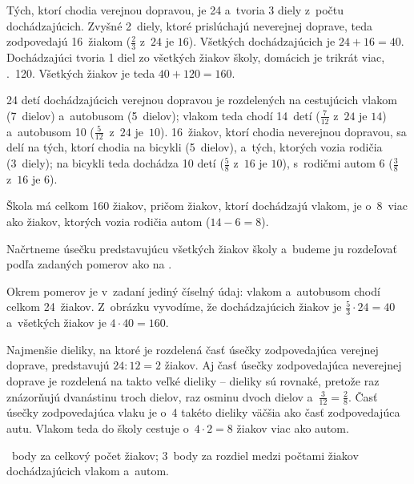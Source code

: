 {%
Tých, ktorí chodia verejnou dopravou, je 24 a~tvoria 3 diely z~počtu dochádzajúcich.
Zvyšné 2~diely, ktoré prislúchajú neverejnej doprave, teda zodpovedajú 16~žiakom
($\frac23$ z~$24$ je $16$).
Všetkých dochádzajúcich je $24 + 16 = 40$.
Dochádzajúci tvoria 1 diel zo všetkých žiakov školy, domácich je trikrát viac,
\tj.~120.
Všetkých žiakov je teda $40 + 120 = 160$.

24 detí dochádzajúcich verejnou dopravou je rozdelených na cestujúcich vlakom
(7~dielov) a~autobusom (5~dielov);
vlakom teda chodí 14~detí ($\frac7{12}$ z~$24$ je $14$) a~autobusom 10
($\frac5{12}$~z~$24$ je~$10$).
16~žiakov, ktorí chodia neverejnou dopravou, sa delí na tých, ktorí chodia na bicykli
(5~dielov), a~tých, ktorých vozia rodičia (3~diely);
na bicykli teda dochádza 10 detí ($\frac58$ z~$16$ je $10$), s~rodičmi autom 6
($\frac38$ z~$16$ je $6$).

\zaver
Škola má celkom 160 žiakov, pričom žiakov, ktorí dochádzajú vlakom, je o~8~viac ako žiakov, ktorých
vozia rodičia autom ($14-6=8$).


\ineriesenie
Načrtneme úsečku predstavujúcu všetkých žiakov školy a~budeme ju rozdeľovať
podľa zadaných pomerov ako na \obr.
%

Okrem pomerov je v~zadaní jediný číselný
údaj: vlakom a~autobusom chodí celkom 24~žiakov.
Z~obrázku vyvodíme, že dochádzajúcich žiakov je $\frac53\cdot 24 = 40$ a~všetkých
žiakov je $4\cdot 40 = 160$.

Najmenšie dieliky, na ktoré je rozdelená časť úsečky zodpovedajúca verejnej
doprave, predstavujú $24 : 12 = 2$ žiakov.
Aj časť úsečky zodpovedajúca neverejnej doprave je rozdelená na takto veľké
dieliky -- dieliky sú rovnaké, pretože raz znázorňujú dvanástinu troch dielov,
raz osminu dvoch dielov a~$\frac3{12}=\frac28$.
Časť úsečky zodpovedajúca vlaku je o~4 takéto dieliky väčšia ako časť zodpovedajúca
autu. Vlakom teda do školy cestuje o~$4\cdot 2 = 8$ žiakov viac ako autom.

~body za celkový počet žiakov;
3~body za rozdiel medzi počtami žiakov dochádzajúcich vlakom a~autom.
\endhodnotenie
}

